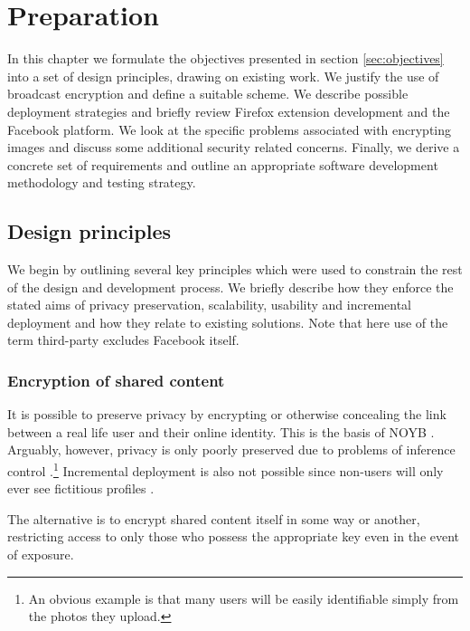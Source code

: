\chapter{Preparation}\label{ch:preparation}

In this chapter we formulate the objectives presented in section \ref{sec:objectives} into a set of design principles, drawing on existing work. We justify the use of broadcast encryption and define a suitable scheme. We describe possible deployment strategies and briefly review Firefox extension development and the Facebook platform. We look at the specific problems associated with encrypting images and discuss some additional security related concerns. Finally, we derive a concrete set of requirements and outline an appropriate software development methodology and testing strategy.


\FloatBarrier
\section{Design principles}
\label{sec:principles}

We begin by outlining several key principles which were used to constrain the rest of the design and development process. We briefly describe how they enforce the stated aims of privacy preservation, scalability, usability and incremental deployment and how they relate to existing solutions. Note that here use of the term third-party excludes Facebook itself.


\FloatBarrier
\subsection{Encryption of shared content}

It is possible to preserve privacy by encrypting or otherwise concealing the link between a real life user and their online identity. This is the basis of NOYB \cite{noyb}. Arguably, however, privacy is only poorly preserved due to problems of inference control \cite{ross}.\footnote{An obvious example is that many users will be easily identifiable simply from the photos they upload.} Incremental deployment is also not possible since non-users will only ever see fictitious profiles \cite{facecloak}.

The alternative is to encrypt shared content itself in some way or another, restricting access to only those who possess the appropriate key even in the event of exposure.



